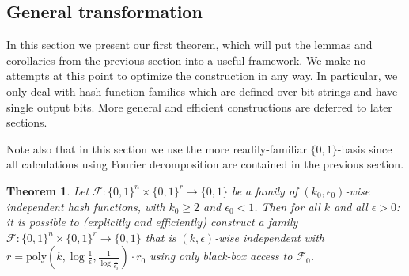 \documentclass[12pt]{article}
\newtheorem{theorem}{Theorem}[section]
\newcommand{\Poly}[1]{\mathrm{poly}\left(#1\right)}
\newcommand{\zo}[1]{\{0,1\}^{#1}}
\newcommand{\F}{\mathcal{F}}
\begin{document}
	\subsection{General transformation} \label{section: general binary transformation}
	
	In this section we present our first theorem, which will put the lemmas and corollaries from the previous section into a useful framework.
	We make no attempts at this point to optimize the construction in any way.
	In particular, we only deal with hash function families which are defined over bit strings and have single output bits.
	More general and efficient constructions are deferred to later sections.
	
	Note also that in this section we use the more readily-familiar $\{0,1\}$-basis since all calculations using Fourier decomposition are contained in the previous section.
	
	\begin{theorem} \label{theorem: simplest hash enhancement}
		Let $\F : \zo{n} \times \zo{r} \rightarrow \{0,1\}$ be a family of $(k_0, \epsilon_0)$-wise independent hash functions, with $k_0 \geq 2$ and $\epsilon_0 < 1$. Then for all $k$ and all $\epsilon > 0$: it is possible to (explicitly and efficiently) construct a family $\F : \zo{n} \times \zo{r} \rightarrow \{0,1\}$ that is $(k, \epsilon)$-wise independent with $r = \Poly{k, \log \frac{1}{\epsilon}, \frac{1}{\log \frac{1}{\epsilon_0}}} \cdot r_0$ using only black-box access to $\F_0$.
	\end{theorem}
	
\end{document}
